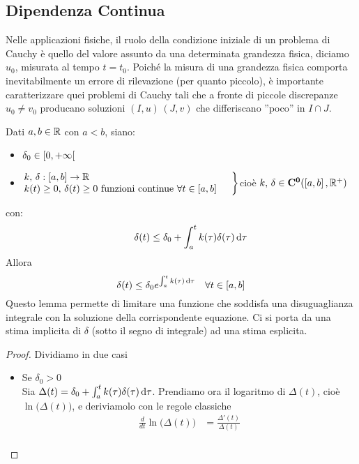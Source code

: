 \subsection{Dipendenza Continua}
Nelle applicazioni fisiche, il ruolo della condizione iniziale di un problema di Cauchy è quello del valore assunto da una determinata grandezza fisica, diciamo $u_0$, misurata al tempo $t=t_0$. Poiché la misura di una grandezza fisica comporta inevitabilmente un errore di rilevazione (per quanto piccolo), è importante caratterizzare quei problemi di Cauchy tali che a fronte di piccole discrepanze $u_0 \neq v_0$ producano soluzioni $(I,u)\,(J,v)$ che differiscano ”poco” in $I\cap J$.
\begin{lemma}
	\label{lemma:gronwall}
	Dati $a,b\in \mathbb{R}$ con $a < b$, siano:
	\begin{itemize}[noitemsep]
		\item $\delta_0\in \left[0,+\infty\right[$
		\item $\hspace{-0.5em}\left.\begin{array}{ll}
				k,\,\delta:\left[a,b\right]\to \mathbb{R} \\
				k(t)\geq 0,\,\delta(t) \geq 0 \text{ funzioni continue } \forall t \in \left[a,b\right]
		\end{array} \quad\right\}$\quad cioè \quad$k,\,\delta\in\mathbf{C^{0}}(\left[a,b\right],\mathbb{R}^{+})$
	\end{itemize}
	con:
	\[\qquad \delta(t) \leq \delta_0+\int_{a}^{t}k(\tau)\delta(\tau)\,\mathrm{d}{\tau}\]
	Allora
	\[\delta(t) \leq \delta_0e^{\int_{a}^{t}k(\tau)\,\mathrm{d}{\tau}} \quad \forall t \in \left[a,b\right]\]
	Questo lemma permette di limitare una funzione che soddisfa una disuguaglianza integrale con la soluzione della corrispondente equazione. Ci si porta da una stima implicita di $\delta$ (sotto il segno di integrale) ad una stima esplicita.
	\begin{proof}
		Dividiamo in due casi
		\begin{itemize}
			\item Se $\delta_0>0$\\
				Sia $\Delta(t) = \delta_0+\int_{a}^{t}k(\tau)\delta(\tau)\,\mathrm{d}{\tau}$. Prendiamo ora il logaritmo di $\Delta(t)$, cioè $\ln{\bigl(\Delta(t)\bigr)}$, e deriviamolo con le regole classiche
				\begin{align*}
					\frac{d}{dt}\ln{\bigl(\Delta(t)\bigr)} &= \frac{\Delta'(t)}{\Delta(t)}\\

\end{align*}
\end{itemize}
\end{proof}
\end{lemma}
